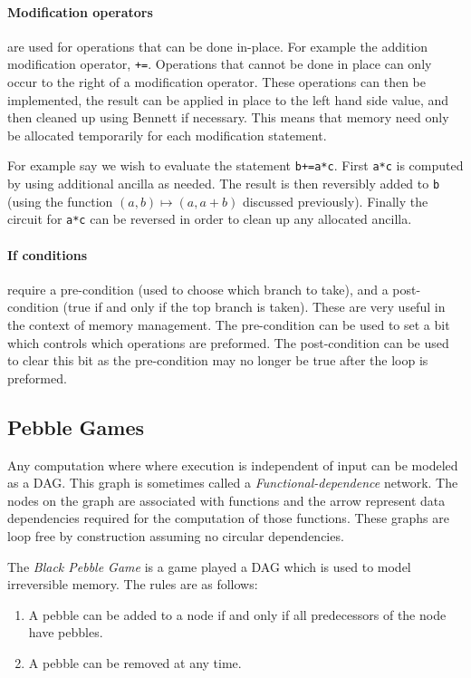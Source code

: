 \paragraph{Modification operators} are used for operations that can be done
in-place. For example the addition modification operator, \verb|+=|. Operations
that cannot be done in place can only occur to the right of a modification
operator. These operations can then be implemented, the result can be applied in
place to the left hand side value, and then cleaned up using Bennett if
necessary. This means that memory need only be allocated temporarily for each
modification statement.

For example say we wish to evaluate the statement \verb|b+=a*c|. First
\verb|a*c| is computed by using additional ancilla as needed. The result is
then reversibly added to \verb|b| (using the function $(a,b)\mapsto(a,a+b)$
discussed previously). Finally the circuit for \verb|a*c| can be reversed in
order to clean up any allocated ancilla.

\paragraph{If conditions} require a pre-condition (used to choose which branch
to take), and a post-condition (true if and only if the top branch is taken).
These are very useful in the context of memory management. The pre-condition can
be used to set a bit which controls which operations are preformed. The
post-condition can be used to clear this bit as the pre-condition may no longer
be true after the loop is preformed.


\subsection{Pebble Games}

Any computation where where execution is independent of input can be modeled as
a DAG. This graph is sometimes called a \emph{Functional-dependence} network.
The nodes on the graph are associated with functions and the arrow represent
data dependencies required for the computation of those functions. These graphs
are loop free by construction assuming no circular dependencies.

The \emph{Black Pebble Game} is a game played a DAG which is used to model
irreversible memory. The rules are as follows:
\begin{enumerate}
  \item A pebble can be added to a node if and only if all predecessors of the
    node have pebbles.
  \item A pebble can be removed at any time.
\end{enumerate}

